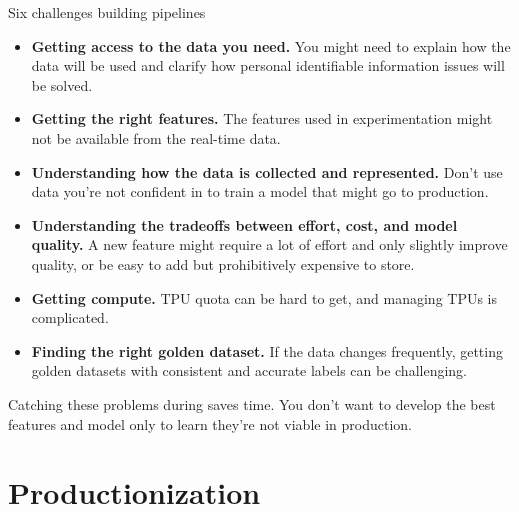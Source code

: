 \begin{frame}{Six challenges building pipelines}
  \begin{withmargin}
    \begin{tdmain}
      \footnotesize
      \begin{itemize}
        \item \textbf{Getting access to the data you need.} You might need to
          explain how the data will be used and clarify how personal
          identifiable information issues will be solved.
        \item \textbf{Getting the right features.} The features used in
          experimentation might not be available from the real-time data.
        \item \textbf{Understanding how the data is collected and represented.}
          Don't use data you're not confident in to train a model that might go
          to production.
        \item \textbf{Understanding the tradeoffs between effort, cost, and
          model quality.} A new feature might require a lot of effort and only
          slightly improve quality, or be easy to add but prohibitively
          expensive to store.
        \item \textbf{Getting compute.} TPU quota can be hard to get, and
          managing TPUs is complicated.
        \item \textbf{Finding the right golden dataset.} If the data changes
          frequently, getting golden datasets with consistent and accurate
          labels can be challenging.
      \end{itemize}
    \end{tdmain}
    \begin{tdmargin}
      \vfill
      Catching these problems during  saves time. You
      don't want to develop the best features and model only to learn they're
      not viable in production.
      \vfill
    \end{tdmargin}
  \end{withmargin}
\end{frame}

\section[Productionization]{Productionization}

